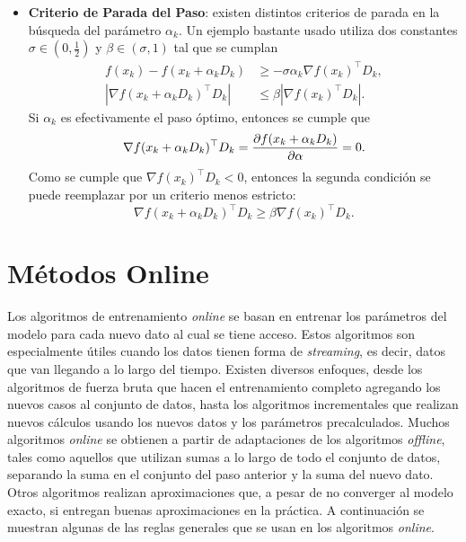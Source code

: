 \begin{itemize}
	\item \textbf{Criterio de Parada del Paso}: existen distintos criterios de parada en la búsqueda del parámetro \(\alpha_k\). Un ejemplo bastante usado utiliza dos constantes \(\sigma \in (0, \frac{1}{2})\) y \(\beta \in (\sigma, 1)\) tal que se cumplan
	\begin{align*}
	f(x_k) - f(x_k + \alpha_k D_k)									&\geq -\sigma \alpha_k \nabla f(x_k)^{\top} D_k,\\
	\left\vert \nabla f(x_k + \alpha_k D_k)^{\top} D_k \right\vert	&\leq \beta \left\vert \nabla f(x_k)^{\top} D_k \right\vert.
	\end{align*}
	Si \(\alpha_k\) es efectivamente el paso óptimo, entonces se cumple que
	\[\nabla f(x_k + \alpha_k D_k)^{\top} D_k = \pdv{f(x_k + \alpha_k D_k)}{\alpha} = 0.\] Como se cumple que \(\nabla f(x_k)^{\top} D_k < 0\), entonces la segunda condición se puede reemplazar por un criterio menos estricto:
	\begin{equation*}
	\nabla f(x_k + \alpha_k D_k)^{\top} D_k \geq \beta \nabla f(x_k)^{\top} D_k.
	\end{equation*}
\end{itemize}

\section{Métodos Online}

Los algoritmos de entrenamiento \emph{online} se basan en entrenar los parámetros del modelo para cada nuevo dato al cual se tiene acceso. Estos algoritmos son especialmente útiles cuando los datos tienen forma de \emph{streaming}, es decir, datos que van llegando a lo largo del tiempo. Existen diversos enfoques, desde los algoritmos de fuerza bruta que hacen el entrenamiento completo agregando los nuevos casos al conjunto de datos, hasta los algoritmos incrementales que realizan nuevos cálculos usando los nuevos datos y los parámetros precalculados. Muchos algoritmos \emph{online} se obtienen a partir de adaptaciones de los algoritmos \emph{offline}, tales como aquellos que utilizan sumas a lo largo de todo el conjunto de datos, separando la suma en el conjunto del paso anterior y la suma del nuevo dato. Otros algoritmos realizan aproximaciones que, a pesar de no converger al modelo exacto, si entregan buenas aproximaciones en la práctica. A continuación se muestran algunas de las reglas generales que se usan en los algoritmos \emph{online}.

